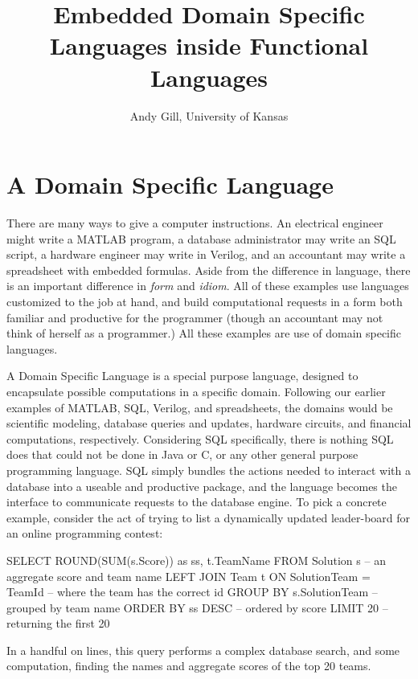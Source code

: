 \documentclass[11pt]{article}
\begin{document}
\title{Embedded Domain Specific Languages inside Functional Languages}
\author{Andy Gill, University of Kansas}
\maketitle

\section{A Domain Specific Language}

There are many ways to give a computer instructions.
%
An electrical engineer might write a MATLAB program,
a database administrator may write an SQL script,
a hardware engineer may write in Verilog,
and an accountant may write a spreadsheet
with embedded formulas.
%
Aside from the difference in language, there is an
important difference in {\em form\/} and {\em idiom\/}.
%
All of these examples use languages
customized to the job at hand, and build computational
requests in a form both familiar and productive
for the programmer (though an accountant may
not think of herself as a programmer.)
All these examples are use of domain specific languages.


A Domain Specific Language is a special purpose language,
designed to encapsulate possible computations in a specific
domain. Following our earlier examples of MATLAB, SQL,
Verilog, and spreadsheets, the domains would be scientific modeling,
database queries and updates, hardware circuits, and financial computations, respectively.
Considering SQL specifically, there is nothing SQL does that could not
be done in Java or C, or any other general purpose programming
language. SQL simply bundles the actions needed to
interact with a database into a useable and productive package,
and the language becomes the interface to communicate requests
to the database engine.
To pick a concrete example,
consider the act of trying to list a dynamically updated leader-board
for an online programming contest:
\begin{Code}
SELECT ROUND(SUM(s.Score)) as ss, t.TeamName FROM Solution s -- an aggregate score and team name
   LEFT JOIN Team t ON SolutionTeam = TeamId                 -- where the team has the correct id
   GROUP BY s.SolutionTeam                                   -- grouped by team name
   ORDER BY ss DESC                                          -- ordered by score
   LIMIT 20                                                  -- returning the first 20
\end{Code}
In a handful on lines, this query performs a complex
database search, and some computation, finding
the names and aggregate scores of the top 20 teams.
\end{document}
